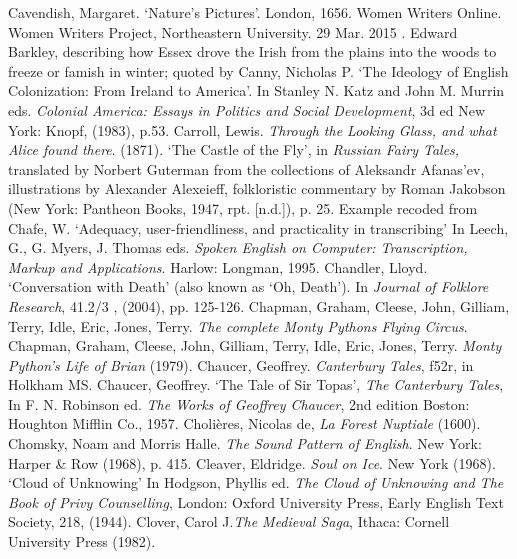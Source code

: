 \begin{bibitemlist}{1}
 Cavendish, Margaret. ‘Nature's Pictures’. London, 1656. Women Writers Online. Women Writers Project, Northeastern University. 29 Mar. 2015 .
 Edward Barkley, describing how Essex drove the Irish from the plains into the woods to freeze or famish in winter; quoted by Canny, Nicholas P. ‘The Ideology of English Colonization: From Ireland to America’. In Stanley N. Katz and John M. Murrin eds. \textit{Colonial America: Essays in Politics and Social Development}, 3d ed New York: Knopf, (1983), p.53. 
 Carroll, Lewis. \textit{Through the Looking Glass, and what Alice found there}. (1871).
 ‘The Castle of the Fly’, in \textit{Russian Fairy Tales,} translated by Norbert Guterman from the collections of Aleksandr Afanas'ev, illustrations by Alexander Alexeieff, folkloristic commentary by Roman Jakobson (New York: Pantheon Books, 1947, rpt. [n.d.]), p. 25.
 Example recoded from Chafe, W.  ‘Adequacy, user-friendliness, and practicality in transcribing’ In Leech, G., G. Myers, J. Thomas eds. \textit{Spoken English on Computer: Transcription, Markup and Applications}. Harlow: Longman, 1995.
 Chandler, Lloyd. ‘Conversation with Death’ (also known as ‘Oh, Death’). In \textit{Journal of Folklore Research}, 41.2/3 , (2004), pp. 125-126.
 Chapman, Graham, Cleese, John, Gilliam, Terry, Idle, Eric, Jones, Terry. \textit{The complete Monty Pythons Flying Circus}.
 Chapman, Graham, Cleese, John, Gilliam, Terry, Idle, Eric, Jones, Terry. \textit{Monty Python's Life of Brian} (1979). 
 Chaucer, Geoffrey. \textit{Canterbury Tales}, f52r, in Holkham MS.
 Chaucer, Geoffrey. ‘The Tale of Sir Topas’, \textit{The Canterbury Tales}, In F. N. Robinson ed. \textit{The Works of Geoffrey Chaucer}, 2nd edition Boston: Houghton Mifflin Co., 1957.
 Cholières, Nicolas de, \textit{La Forest Nuptiale} (1600).
 Chomsky, Noam and Morris Halle. \textit{The Sound Pattern of English}. New York: Harper \& Row (1968), p. 415.
 Cleaver, Eldridge. \textit{Soul on Ice}. New York (1968).
 ‘Cloud of Unknowing’ In Hodgson, Phyllis ed. \textit{The Cloud of Unknowing and The Book of Privy Counselling}, London: Oxford University Press, Early English Text Society, 218, (1944).
 Clover, Carol J.\textit{The Medieval Saga}, Ithaca: Cornell University Press (1982).

\end{bibitemlist}
